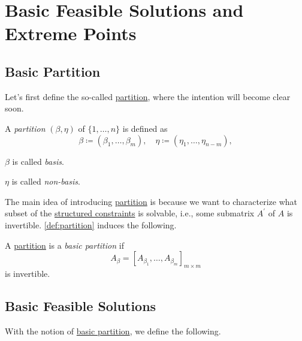\section{Basic Feasible Solutions and Extreme Points}

\subsection{Basic Partition}
Let's first define the so-called \hyperref[def:partition]{partition}, where the intention will become clear soon.

\begin{definition}[Partition]\label{def:partition}
	A \emph{partition} \((\beta , \eta )\) of \(\{1, \ldots , n\}\) is defined as
	\[
		\beta \coloneqq (\beta_1, \ldots , \beta_m),\quad \eta \coloneqq (\eta_1, \ldots , \eta_{n-m}),
	\]

	\begin{definition}[Basis]\label{def:basis}
		\(\beta\) is called \emph{basis}.
	\end{definition}
	\begin{definition}\label{def:non-basis}
		\(\eta\) is called \emph{non-basis}.
	\end{definition}
\end{definition}

The main idea of introducing \hyperref[def:partition]{partition} is because we want to characterize what subset of the \hyperref[def:structured-constraint]{structured constraints} is solvable, i.e., some submatrix \(A^\prime \) of \(A\) is invertible. \autoref{def:partition} induces the following.

\begin{definition}\label{def:basic-partition}
	A \hyperref[def:partition]{partition} is a \emph{basic partition} if
	\[
		A_{\beta} = \left[ A_{\beta_1}, \ldots , A_{\beta_m} \right]_{m\times m}
	\]
	is invertible.
\end{definition}

\subsection{Basic Feasible Solutions}
With the notion of \hyperref[def:basic-partition]{basic partition}, we define the following.

